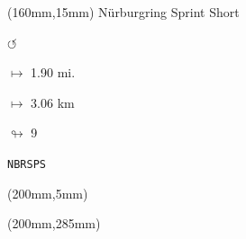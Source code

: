 \begin{textblock*}{40mm}(160mm,15mm)%
Nürburgring Sprint Short
\par \Huge$\circlearrowleft$
\Large
\par$\mapsto$ 1.90 mi.
\par$\mapsto$ 3.06 km
\par$\looparrowright$ 9
\par\hfill\tiny\tt NBRSPS\\
\end{textblock*}
\begin{textblock*}{20mm}(200mm,5mm)%
\fbox{\thepage}
\end{textblock*}
\begin{textblock*}{20mm}(200mm,285mm)%
\fbox{\thepage}
\end{textblock*}
\null\newpage

